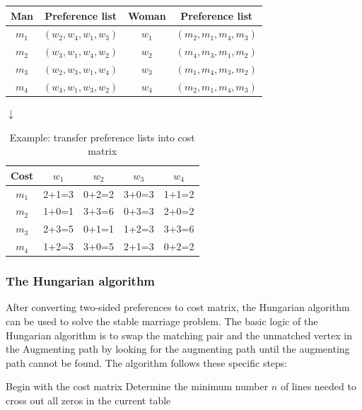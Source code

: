 \documentclass[14pt]{extarticle}
\begin{document}
\begin{table}[H]
  \centering
  \begin{tabular}{|c|c|c|c|}
    \hline
    Man & Preference list & Woman & Preference list \\
    \hline
    \hline
    $m_1$ & $(w_2, w_4, w_1, w_3)$ & $w_1$ & $(m_2, m_1, m_4, m_3)$ \\
    \hline
    $m_2$ & $(w_3, w_1, w_4, w_2)$ & $w_2$ & $(m_4, m_3, m_1, m_2)$ \\
    \hline
    $m_3$ & $(w_2, w_3, w_1, w_4)$ & $w_3$ & $(m_1, m_4, m_3, m_2)$ \\
    \hline
    $m_4$ & $(w_4, w_1, w_3, w_2)$ & $w_4$ & $(m_2, m_1, m_4, m_3)$ \\
    \hline
  \end{tabular}
\end{table}
\begin{center}
  $\downarrow$
\end{center}  
\begin{table}[H]
  \centering  
    \begin{tabular}{|c|c|c|c|c|}
    \hline
    Cost & $w_1$ & $w_2$ & $w_3$ & $w_4$ \\
    \hline
    \hline
    $m_1$ & 2+1=3 & 0+2=2 & 3+0=3 & 1+1=2 \\
    \hline
    $m_2$ & 1+0=1 & 3+3=6 & 0+3=3 & 2+0=2 \\
    \hline
    $m_3$ & 2+3=5 & 0+1=1 & 1+2=3 & 3+3=6 \\
    \hline
    $m_4$ & 1+2=3 & 3+0=5 & 2+1=3 & 0+2=2 \\
    \hline
  \end{tabular} 
  \caption{Example: transfer preference lists into cost matrix}
\end{table}

\subsubsection{The Hungarian algorithm}

After converting two-sided preferences to cost matrix, the Hungarian algorithm can be used to solve the stable marriage problem.
The basic logic of the Hungarian algorithm is to swap the matching pair and the unmatched vertex in the Augmenting path by looking for the augmenting path until the augmenting path cannot be found.
The algorithm follows these specific steps:

\begin{algorithm}[H]
  \SetAlgoLined
  Begin with the cost matrix\;
  Determine the minimum number $n$ of lines needed to cross out all zeros in the current table\;
\end{algorithm}
\end{document}
